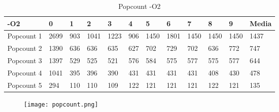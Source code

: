 \begin{table}[!htbp]
\centering
\caption{Popcount -O2}
\label{my-label}
\begin{tabular}{|l|l|l|l|l|l|l|l|l|l|l|l|}\hline
-O2        & 0    & 1    & 2    & 3    & 4    & 5    & 6    & 7    & 8    & 9    & Media \\\hline
Popcount 1 & 2699 & 903  & 1041 & 1223 & 906  & 1450 & 1801 & 1450 & 1450 & 1450 & 1437  \\\hline
Popcount 2 & 1390 & 636  & 636  & 635  & 627  & 702  & 729  & 702  & 636  & 772  & 747   \\\hline
Popcount 3 & 1397 & 529  & 525  & 521  & 576  & 584  & 575  & 577  & 575  & 577  & 644   \\\hline
Popcount 4 & 1041 & 395  & 396  & 390  & 431  & 431  & 431  & 431  & 408  & 430  & 478   \\\hline
Popcount 5 & 294  & 110  & 110  & 109  & 122  & 121  & 121  & 121  & 122  & 121  & 135  \\ \hline
\end{tabular}
\end{table}

\begin{figure}[!htbp]
  \centering
  \texttt{[image: popcount.png]}
\end{figure}
